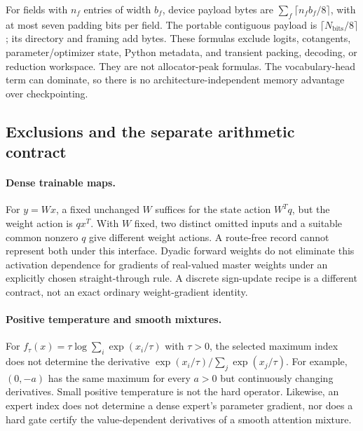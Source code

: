 For fields with $n_f$ entries of width $b_f$, device payload bytes are
$\sum_f\lceil n_fb_f/8\rceil$, with at most seven padding bits per field.
The portable contiguous payload is $\lceil N_{\mathrm{bits}}/8\rceil$;
its directory and framing add bytes. These formulas exclude logits,
cotangents, parameter/optimizer state, Python metadata, and transient
packing, decoding, or reduction workspace. They are not allocator-peak
formulas. The vocabulary-head term can dominate, so there is no
architecture-independent memory advantage over checkpointing.

\subsection{Exclusions and the separate arithmetic contract}
\label{app:exclusions}

\paragraph{Dense trainable maps.}
For $y=Wx$, a fixed unchanged $W$ suffices for the state action $W^Tq$, but
the weight action is $qx^T$. With $W$ fixed, two distinct omitted inputs and
a suitable common nonzero $q$ give different weight actions. A route-free
record cannot represent both under this interface. Dyadic forward weights
do not eliminate this activation dependence for gradients of real-valued
master weights under an explicitly chosen straight-through rule. A
discrete sign-update recipe is a different contract, not an exact ordinary
weight-gradient identity.

\paragraph{Positive temperature and smooth mixtures.}
For $f_\tau(x)=\tau\log\sum_i\exp(x_i/\tau)$ with $\tau>0$, the selected
maximum index does not determine the derivative
$\exp(x_i/\tau)/\sum_j\exp(x_j/\tau)$. For example, $(0,-a)$ has the same
maximum for every $a>0$ but continuously changing derivatives. Small positive
temperature is not the hard operator. Likewise, an expert index does not
determine a dense expert's parameter gradient, nor does a hard gate certify
the value-dependent derivatives of a smooth attention mixture.

